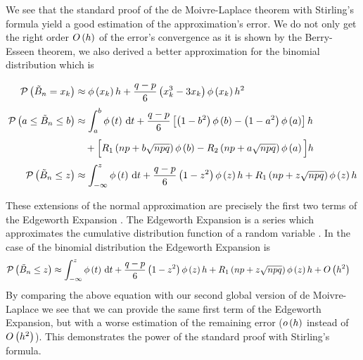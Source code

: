 


We see that the standard proof of the de Moivre-Laplace theorem with Stirling's formula yield a good estimation of the approximation's error. We do not only get the right order $O\left( {h} \right)$ of the error's convergence as it is shown by the Berry-Esseen theorem, we also derived a better approximation for the binomial distribution which is

\begin{align}
  \P{\BBs = \x}& \approx \fphi{\x} h +\frac{q-p}6 \left(\x^3-3\x\right) \fphi{\x} h^2 \nl
  \P{a \le \BBs \le b} & \approx  \int_a^b \fphi{t} \d{t} + \frac{q-p}6 \left[\br{1-b^2}\fphi{b}-\br{1-a^2}\fphi{a}\right] h \nl
  & \quad +\Big[\Ro{np + b\sqrt{npq}}\fphi{b} - \Rt{np + a \sqrt{npq}}\fphi{a}\Big]h \nl
  \P{\BBs \le z} & \approx \int_{-\infty}^z \fphi{t} \d{t} + \frac{q-p}6 \br{1-z^2}\fphi{z} h + \Ro{np+z\sqrt{npq}} \fphi{z} h 
\end{align}

These extensions of the normal approximation are precisely the first two terms of the Edgeworth Expansion \cite[pp. 39 ff.]{hall}\cite{wiki:edgeworth}. The Edgeworth Expansion is a series which approximates the cumulative distribution function of a random variable \cite{wiki:edgeworth}. In the case of the binomial distribution the Edgeworth Expansion is \cite[p. 46]{hall}
\begin{align}
  \mathcal P\left({\tilde B_{n} \le z}\right) & \approx \int_{-\infty}^z \phi\left( {t} \right) \,\mathrm d{t} + \frac{q-p}6 \left( {1-z^2} \right)\phi\left( {z} \right) h + R_1\left({np + z \sqrt{npq}}\right)\phi\left( {z} \right)h + O\left( {h^2} \right)
\end{align}
By comparing the above equation with our second global version of de Moivre-Laplace we see that we can provide the same first term of the Edgeworth Expansion, but with a worse estimation of the remaining error ($o\left( {h} \right)$ instead of $O\left( {h^2} \right)$). This demonstrates the power of the standard proof with Stirling's formula.
